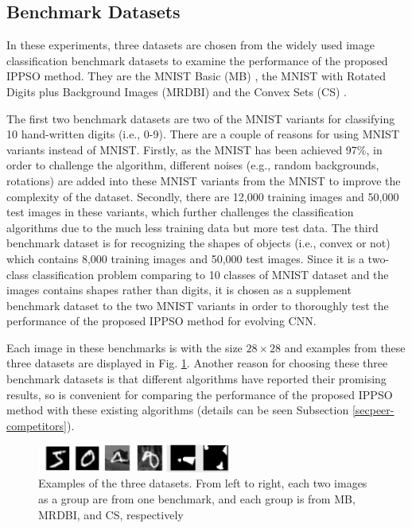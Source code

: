 \documentclass[conference]{IEEEtran}
\begin{document}
\subsection{Benchmark Datasets}\label{sec:EPDatasets}

In these experiments, three datasets are chosen from the widely used image classification benchmark datasets to examine the performance of the proposed IPPSO method. They are the MNIST Basic (MB) \cite{DeepArchitectureEval:Larochelle}, the MNIST with Rotated Digits plus Background Images (MRDBI) \cite{DeepArchitectureEval:Larochelle} and the Convex Sets (CS) \cite{DeepArchitectureEval:Larochelle}. 

The first two benchmark datasets are two of the MNIST \cite{DocumentRecognition:LeCun} variants for classifying 10 hand-written digits (i.e., 0-9). There are a couple of reasons for using MNIST variants instead of MNIST. Firstly, as the MNIST has been achieved 97\%, in order to challenge the algorithm, different noises (e.g., random backgrounds, rotations) are added into these MNIST variants from the MNIST to improve the complexity of the dataset. Secondly, there are 12,000 training images and 50,000 test images in these variants, which further challenges the classification algorithms due to the much less training data but more test data. The third benchmark dataset is for recognizing the shapes of objects (i.e., convex or not) which contains 8,000 training images and 50,000 test images. Since it is a two-class classification problem comparing to 10 classes of MNIST dataset and the images contains shapes rather than digits, it is chosen as a supplement benchmark dataset to the two MNIST variants in order to thoroughly test the performance of the proposed IPPSO method for evolving CNN. 

Each image in these benchmarks is with the size $28 \times 28$ and examples from these three datasets are displayed in Fig. \ref{fig:images}. Another reason for choosing these three benchmark datasets is that different algorithms have reported their promising results, so is convenient for comparing the performance of the proposed IPPSO method with these existing algorithms (details can be seen Subsection \ref{secpeer-competitors}).

\begin{figure}[!t]
	\centering
	\includegraphics[width=2.5in]{ippso_image_samples}
	\caption{Examples of the three datasets. From left to right, each two images as a group are from one benchmark, and each group is from MB, MRDBI, and CS, respectively}
	\label{fig:images}
\end{figure}
\end{document}
